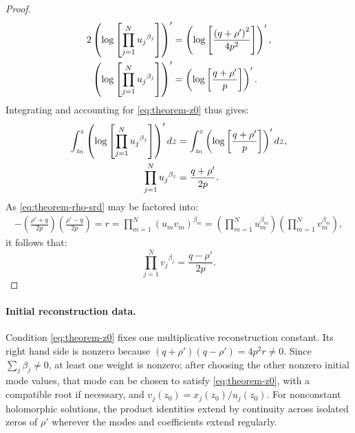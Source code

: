 \documentclass[11pt,a4paper]{article}
\numberwithin{equation}{section}
\begin{document}
\begin{proof}
\begin{align}
    2\left(\log{\left[\prod_{j=1}^{N}{u_j}^{\beta_j}\right]}\right)'  &= \left(\log{\left[\frac{\left(q + \rho'\right)^2}{4p^2}\right]}\right)', \notag \\
    \left(\log{\left[\prod_{j=1}^{N}{u_j}^{\beta_j}\right]}\right)'  &= \left(\log{\left[\frac{q + \rho'}{p}\right]}\right)'.
\end{align}
Integrating and accounting for \eqref{eq:theorem-z0} thus gives:
\begin{align}
    \int_{z_0}^{z}\left(\log{\left[\prod_{j=1}^{N}{u_j}^{\beta_j}\right]}\right)'{dz}  &= \int_{z_0}^{z}\left(\log{\left[\frac{q + \rho'}{p}\right]}\right)'{dz}, \notag \\
    \prod_{j=1}^{N}{u_j}^{\beta_j}  &= \frac{q + \rho'}{2p}.
\end{align}
As \eqref{eq:theorem-rho-srd} may be factored into:
\begin{align}
    -\left(\frac{\rho' + q}{2p}\right)\left(\frac{\rho' - q}{2p}\right) = r = \prod_{m=1}^{N}\left(u_m v_m\right)^{\beta_m} = \left(\prod_{m=1}^{N}u_m^{\beta_m}\right)\left(\prod_{m=1}^{N}v_m^{\beta_m}\right),
\end{align}
it follows that:
\begin{equation}
    \prod_{j=1}^{N}{v_j}^{\beta_j}  = \frac{q - \rho'}{2p}.
\end{equation}

\end{proof}


\paragraph{Initial reconstruction data.}
Condition \eqref{eq:theorem-z0} fixes one multiplicative reconstruction constant.
Its right hand side is nonzero because $(q+\rho')(q-\rho')=4p^2r\ne0$.
Since $\sum_j\beta_j\ne0$, at least one weight is nonzero; after choosing the other nonzero initial mode values, that mode can be chosen to satisfy \eqref{eq:theorem-z0}, with a compatible root if necessary, and $v_j(z_0)=x_j(z_0)/u_j(z_0)$.
For nonconstant holomorphic solutions, the product identities extend by continuity across isolated zeros of $\rho'$ wherever the modes and coefficients extend regularly.
\end{document}
